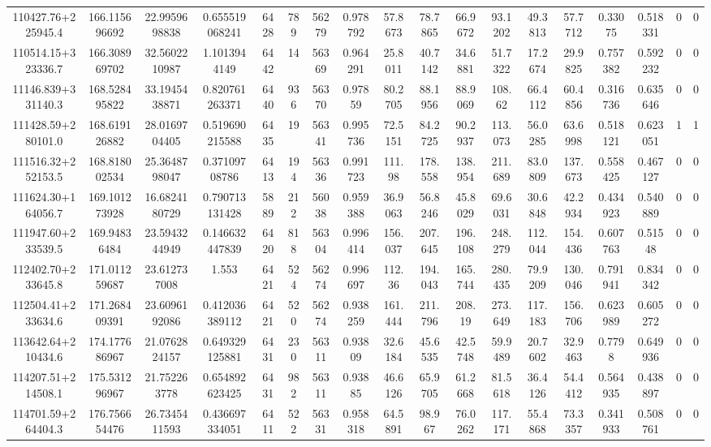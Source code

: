 \begin{table}
\begin{tabular}{cccccccccccccccccc}
110427.76+225945.4 & 166.115696692 & 22.9959698838 & 0.655519068241 & 6428 & 789 & 56279 & 0.978792 & 57.8673 & 78.7865 & 66.9672 & 93.1202 & 49.3813 & 57.7712 & 0.33075 & 0.518331 & 0 & 0 \\
110514.15+323336.7 & 166.308969702 & 32.5602210987 & 1.1013944149 & 6442 & 14 & 56369 & 0.964291 & 25.8011 & 40.7142 & 34.6881 & 51.7322 & 17.2674 & 29.9825 & 0.757382 & 0.592232 & 0 & 0 \\
11146.839+331140.3 & 168.528495822 & 33.1945438871 & 0.820761263371 & 6440 & 936 & 56370 & 0.97859 & 80.2705 & 88.1956 & 88.9069 & 108.62 & 66.4112 & 60.4856 & 0.316736 & 0.635646 & 0 & 0 \\
111428.59+280101.0 & 168.619126882 & 28.0169704405 & 0.519690215588 & 6435 & 19 & 56341 & 0.995736 & 72.5151 & 84.2725 & 90.2937 & 113.073 & 56.0285 & 63.6998 & 0.518121 & 0.623051 & 1 & 1 \\
111516.32+252153.5 & 168.818002534 & 25.3648798047 & 0.37109708786 & 6413 & 194 & 56336 & 0.991723 & 111.98 & 178.558 & 138.954 & 211.689 & 83.0809 & 137.673 & 0.558425 & 0.467127 & 0 & 0 \\
111624.30+164056.7 & 169.101273928 & 16.6824180729 & 0.790713131428 & 5889 & 212 & 56038 & 0.959388 & 36.9063 & 56.8246 & 45.8029 & 69.6031 & 30.6848 & 42.2934 & 0.434923 & 0.540889 & 0 & 0 \\
111947.60+233539.5 & 169.94836484 & 23.5943244949 & 0.146632447839 & 6420 & 818 & 56304 & 0.996414 & 156.037 & 207.645 & 196.108 & 248.279 & 112.044 & 154.436 & 0.607763 & 0.51548 & 0 & 0 \\
112402.70+233645.8 & 171.011259687 & 23.612737008 & 1.553 & 6421 & 524 & 56274 & 0.996697 & 112.36 & 194.043 & 165.744 & 280.435 & 79.9209 & 130.046 & 0.791941 & 0.834342 & 0 & 0 \\
112504.41+233634.6 & 171.268409391 & 23.6096192086 & 0.412036389112 & 6421 & 520 & 56274 & 0.938259 & 161.444 & 211.796 & 208.19 & 273.649 & 117.183 & 156.706 & 0.623989 & 0.605272 & 0 & 0 \\
113642.64+210434.6 & 174.177686967 & 21.0762824157 & 0.649329125881 & 6431 & 230 & 56311 & 0.93809 & 32.6184 & 45.6535 & 42.5748 & 59.9489 & 20.7602 & 32.9463 & 0.7798 & 0.649936 & 0 & 0 \\
114207.51+214508.1 & 175.531296967 & 21.752263778 & 0.654892623425 & 6431 & 982 & 56311 & 0.93885 & 46.6126 & 65.9705 & 61.2668 & 81.5618 & 36.4126 & 54.4412 & 0.564935 & 0.438897 & 0 & 0 \\
114701.59+264404.3 & 176.756654476 & 26.7345411593 & 0.436697334051 & 6411 & 522 & 56331 & 0.958318 & 64.5891 & 98.967 & 76.0262 & 117.171 & 55.4868 & 73.3357 & 0.341933 & 0.508761 & 0 & 0 \\

\end{tabular}
\end{table}
